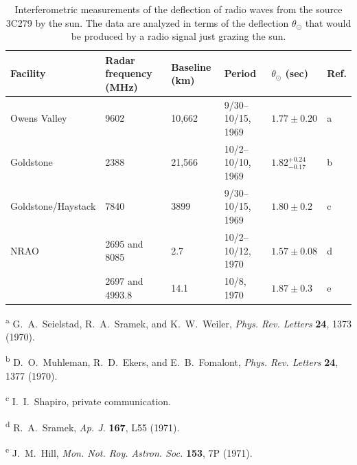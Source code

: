 \begingroup
\renewcommand{\thetable}{8.2}
\begin{table}[p]
\centering
\caption{Interferometric measurements of the deflection of radio waves from
the source 3C279 by the sun. The data are analyzed in terms of the
deflection \(\theta_\odot\) that would be produced by a radio signal just
grazing the sun.}
\label{tab:8.2}
\scriptsize
\begin{tabular}{@{}llllll@{}}
\toprule
Facility & Radar frequency (MHz) & Baseline (km) & Period &
\(\theta_\odot\) (sec) & Ref.\\
\midrule
Owens Valley & 9602 & 10,662 & 9/30--10/15, 1969 &
  \(1.77\pm0.20\) & a\\
Goldstone & 2388 & 21,566 & 10/2--10/10, 1969 &
  \(1.82^{+0.24}_{-0.17}\) & b\\
Goldstone/Haystack & 7840 & 3899 & 9/30--10/15, 1969 &
  \(1.80\pm0.2\) & c\\
NRAO & 2695 and 8085 & 2.7 & 10/2--10/12, 1970 &
  \(1.57\pm0.08\) & d\\
 & 2697 and 4993.8 & 14.1 & 10/8, 1970 &
  \(1.87\pm0.3\) & e\\
\bottomrule
\end{tabular}

\medskip
\begin{minipage}{0.94\textwidth}\scriptsize
\textsuperscript{a} G.~A.~Seielstad, R.~A.~Sramek, and K.~W.~Weiler,
\textit{Phys. Rev. Letters} \textbf{24}, 1373 (1970).\par
\textsuperscript{b} D.~O.~Muhleman, R.~D.~Ekers, and E.~B.~Fomalont,
\textit{Phys. Rev. Letters} \textbf{24}, 1377 (1970).\par
\textsuperscript{c} I.~I.~Shapiro, private communication.\par
\textsuperscript{d} R.~A.~Sramek, \textit{Ap. J.} \textbf{167}, L55
(1971).\par
\textsuperscript{e} J.~M.~Hill, \textit{Mon. Not. Roy. Astron. Soc.}
\textbf{153}, 7P (1971).
\end{minipage}
\end{table}
\endgroup
